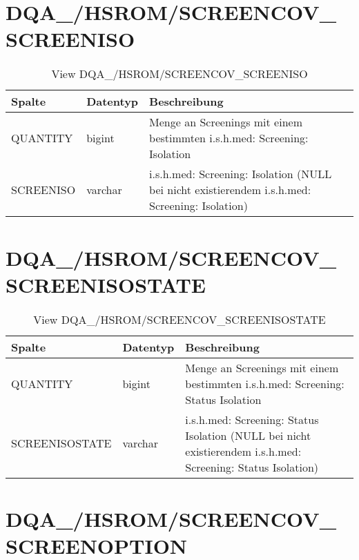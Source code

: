   \section{DQA\_/HSROM/SCREENCOV\_\\ SCREENISO}

  \begin{table}[ht]
    \centering
    \caption{View DQA\_/HSROM/SCREENCOV\_SCREENISO}
    \label{tab:dqa/hsrom/screencovscreeniso}
    \begin{tabular}{||l|l|p{10cm}||}
      \hline
      Spalte & Datentyp & Beschreibung \\ [0.5ex] \hline \hline
      QUANTITY & bigint & Menge an Screenings mit einem bestimmten i.s.h.med: Screening: Isolation \\ \hline
      SCREENISO & varchar & i.s.h.med: Screening: Isolation (NULL bei nicht existierendem i.s.h.med: Screening: Isolation)\\ \hline
    \end{tabular}
  \end{table}
 
  \section{DQA\_/HSROM/SCREENCOV\_\\ SCREENISOSTATE}

  \begin{table}[ht]
    \centering
    \caption{View DQA\_/HSROM/SCREENCOV\_SCREENISOSTATE}
    \label{tab:dqa/hsrom/screencovscreenisostate}
    \begin{tabular}{||l|l|p{10cm}||}
      \hline
      Spalte & Datentyp & Beschreibung \\ [0.5ex] \hline \hline
      QUANTITY & bigint & Menge an Screenings mit einem bestimmten i.s.h.med: Screening: Status Isolation \\ \hline
      SCREENISOSTATE & varchar & i.s.h.med: Screening: Status Isolation (NULL bei nicht existierendem i.s.h.med: Screening: Status Isolation)\\ \hline
    \end{tabular}
  \end{table}
 \clearpage
  \section{DQA\_/HSROM/SCREENCOV\_\\ SCREENOPTION}

